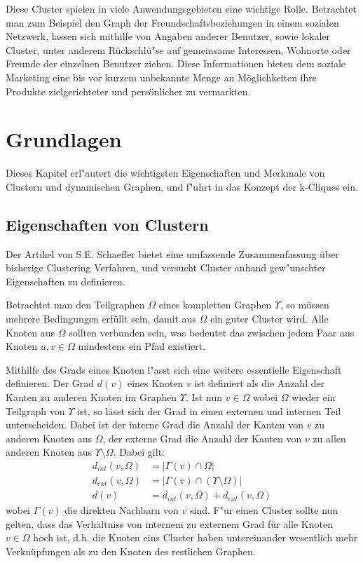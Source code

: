 \documentclass[journal]{vgtc}
\begin{document}
  Diese Cluster spielen in viele Anwendungsgebieten eine wichtige Rolle. 
  Betrachtet man zum Beispiel den Graph der Freundschaftsbeziehungen in einem sozialen Netzwerk,
  lassen sich mithilfe von Angaben anderer Benutzer, sowie lokaler Cluster, unter anderem Rückschlü"se 
  auf gemeinsame Interessen, Wohnorte oder Freunde der einzelnen Benutzer ziehen.
  Diese Informationen bieten dem soziale Marketing eine bis vor kurzem unbekannte Menge
  an Möglichkeiten ihre Produkte zielgerichteter und persönlicher zu vermarkten.

\section{Grundlagen}
  
  Dieses Kapitel erl"autert die wichtigsten Eigenschaften und Merkmale von Clustern und
  dynamischen Graphen, und f"uhrt in das Konzept der k-Cliques ein.
  
  \subsection{Eigenschaften von Clustern}
  \label{sec:properties} 
  Der Artikel von S.E. Schaeffer \cite{Schaeffer} bietet eine umfassende Zusammenfassung
  über bisherige Clustering Verfahren, und versucht Cluster anhand gew"unschter
  Eigenschaften zu definieren.
  
  Betrachtet man den Teilgraphen $\Omega$ eines kompletten Graphen $\Upsilon$, so müssen
  mehrere Bedingungen erfüllt sein, damit aus $\Omega$ ein guter Cluster wird.
  Alle Knoten aus $\Omega$ sollten verbunden sein, was bedeutet das 
  zwischen jedem Paar aus Knoten $u,v \in \Omega$ mindestens ein Pfad existiert. 
  
  Mithilfe des Grads eines Knoten l"asst sich eine weitere essentielle Eigenschaft definieren.
  Der Grad $d(v)$ eines Knoten $v$ ist definiert als die Anzahl der Kanten zu anderen Knoten im
  Graphen $\Upsilon$. Ist nun $v \in \Omega$ wobei $\Omega$ wieder ein Teilgraph von $\Upsilon$
  ist, so lässt sich der Grad in einen externen und internen Teil unterscheiden. Dabei
  ist der interne Grad die Anzahl der Kanten von $v$ zu anderen Knoten aus $\Omega$, der externe
  Grad die Anzahl der Kanten von $v$ zu allen anderen Knoten aus $\Upsilon \setminus \Omega$.
  Dabei gilt:
    \begin{align}
      d_{int}(v, \Omega) &= |\Gamma(v) \cap \Omega |\\
      d_{ext}(v, \Omega) &= |\Gamma(v) \cap (\Upsilon \setminus \Omega) | \\
      d(v) &= d_{int}(v, \Omega) + d_{ext}(v, \Omega)
    \end{align}
  wobei $\Gamma(v)$ die direkten Nachbarn von $v$ sind.
  F"ur einen Cluster sollte nun gelten, dass das Verhältniss von internem zu externem Grad für alle Knoten $v \in \Omega$
  hoch ist, d.h. die Knoten eins 
  Cluster haben untereinander wesentlich mehr Verknüpfungen als zu den Knoten des restlichen Graphen.
   
\end{document}
